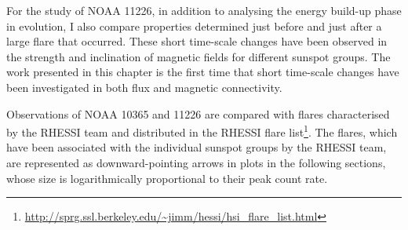 {For the study of NOAA 11226, in addition to analysing the energy build-up phase in evolution, I also compare properties determined just before and just after a large flare that occurred. These short time-scale changes have been observed in the strength \citep{Sudol:2005} and inclination \citep{Murray:2012} of magnetic fields for different sunspot groups. The work presented in this chapter is the first time that short time-scale changes have been investigated in both flux and magnetic connectivity.

Observations of NOAA 10365 and 11226 are compared with flares characterised by the \gls{RHESSI} team and distributed in the \gls{RHESSI} flare list\footnote{\url{http://sprg.ssl.berkeley.edu/\~jimm/hessi/hsi_flare_list.html}}. The flares, which have been associated with the individual sunspot groups by the \gls{RHESSI} team, are represented as downward-pointing arrows in plots in the following sections, whose size is logarithmically proportional to their peak count rate. 

}
